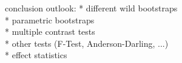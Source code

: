 conclusion
outlook:
* different wild bootstraps \\
* parametric bootstraps \\
* multiple contrast tests \\
* other tests (F-Test, Anderson-Darling, ...) \\
* effect statistics